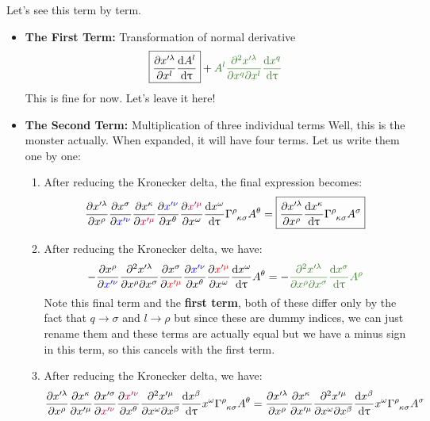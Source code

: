 Let's see this term by term. 
\begin{itemize}
    \item \textbf{The First Term:} Transformation of normal derivative 
    $$ \boxed{\pdv{x'^\lambda}{x^l} \dv{A^l}{\uptau} }
+ \mathcolor{OliveGreen}{A^l \pdv{x'^\lambda}{x^q}{x^l} \dv{x^q}{\uptau}}$$
This is fine for now. Let's leave it here!
    \item \textbf{The Second Term:} Multiplication of three individual terms
    Well, this is the monster  actually. When expanded, it will have four terms. Let us write them one by one: 
    \begin{enumerate}
        \item After reducing the Kronecker delta, the final expression becomes: \begin{align*} 
            \pdv{x'^\lambda}{x^\rho}\pdv{{x^\sigma}}{\mathcolor{blue}{x'^\nu}} \pdv{{x^\kappa}}{\mathcolor{purple}{x'^\mu}}\pdv{\mathcolor{blue}{x'^\nu}}{x^\theta}\pdv{\mathcolor{purple}{x'^\mu}}{x^\omega}\dv{x^\omega}{\uptau}\tensor{\Gamma}{^\rho _\kappa _\sigma}A^\theta =\boxed{\pdv{x'^\lambda}{x^\rho}\dv{x^\kappa}{\uptau}\tensor{\Gamma}{^\rho _\kappa _\sigma}A^\sigma}
        \end{align*}
        \item After reducing the Kronecker delta, we have:
        \begin{align*}
            - {\pdv{{x^\rho}}{\mathcolor{blue}{x'^\nu}}}{\pdv{x'^\lambda}{x^\rho}{x^\sigma}\pdv{{x^\sigma}}{{\mathcolor{red}{{x'^\mu}}}}}\pdv{\mathcolor{blue}{x'^\nu}}{x^\theta}\pdv{\mathcolor{red}{x'^\mu}}{x^\omega}\dv{x^\omega}{\uptau}A^\theta = -\mathcolor{OliveGreen}{\pdv{x'^\lambda}{x^\rho}{x^\sigma} \dv{x^\sigma}{\uptau}A^\rho}
        \end{align*}
        Note this final term and the \textbf{first term}, both of these differ only by the fact that $q\rightarrow \sigma$ and $l \rightarrow \rho$ but since these are dummy indices, we can just rename them and these terms are actually equal but we have a minus sign in this term, so this cancels with the first term. 
        \item After reducing the Kronecker delta, we have:
        \begin{align*}
            \pdv{x'^\lambda}{x^\rho} \pdv{x^\kappa}{x'^\mu} \pdv{x'^\sigma}{\mathcolor{purple}{x'^\nu}} \pdv{\mathcolor{purple}{x'^\nu}}{x^\theta} \pdv{x'^\mu}{x^\omega}{x^\beta} \dv{x^\beta}{\uptau} x^\omega \tensor{\Gamma}{^\rho_\kappa _\sigma} A^\theta = \pdv{x'^\lambda}{x^\rho} \pdv{x^\kappa}{x'^\mu} \pdv{x'^\mu}{x^\omega}{x^\beta} \dv{x^\beta}{\uptau} x^\omega \tensor{\Gamma}{^\rho_\kappa _\sigma} A^\sigma

\end{align*}
\end{enumerate}
\end{itemize}
